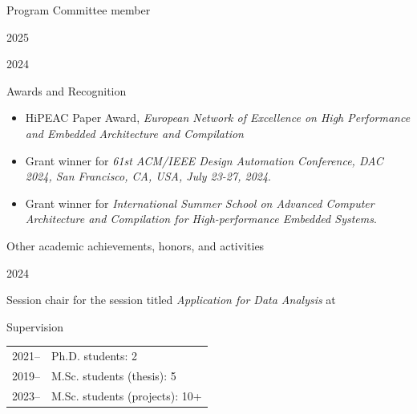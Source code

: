 \documentclass[
	a4paper, %
	10pt, %
]{tresume} %
\begin{document}
%
\begin{tSection}{Program Committee member}
  \begin{tSubsection}{2025}{}{}{}
    \item {}
    \item {}
    \item {}
    \item {}
  \end{tSubsection}
  \begin{tSubsection}{2024}{}{}{}
    \item {}
\end{tSubsection}
\end{tSection}
%
\begin{tSection}{Awards and Recognition}
  \begin{itemize}
  \item[2024] HiPEAC Paper Award, \emph{European Network of Excellence on High
      Performance and Embedded Architecture and Compilation}
  \item[2024] Grant winner for \emph{61st ACM/IEEE Design Automation
      Conference, DAC 2024, San Francisco, CA, USA, July 23-27,
      2024}.
  \item[2021] Grant winner for \emph{International Summer School on Advanced
      Computer Architecture and Compilation for High-performance Embedded
      Systems}.
  \end{itemize}
\end{tSection}

\begin{tSection}{Other academic achievements, honors, and activities}
  \begin{tSubsection}{2024}{}{}{}
    \item Session chair for the session titled \emph{Application for Data
        Analysis} at~
  \end{tSubsection}
\end{tSection}

\begin{tSection}{Supervision}
  \begin{tabular}{ll}
    2021– & Ph.D. students: 2 \\
    2019– & M.Sc. students (thesis): 5 \\
    2023– & M.Sc. students (projects): 10+ \\
\end{tabular}
\end{tSection}

\vfill
\ifpublic{%
    \ifgdpr{%
    
    
  }
  \fi
}
\fi
\end{document}
